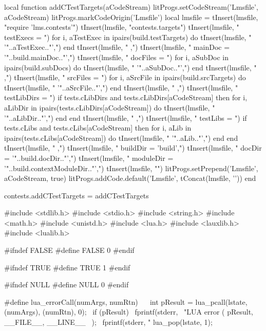 local function addCTestTargets(aCodeStream)
  litProgs.setCodeStream('Lmsfile', aCodeStream)
  litProgs.markCodeOrigin('Lmsfile')
  local lmsfile = {}
  tInsert(lmsfile, "require 'lms.contests'\n")
  tInsert(lmsfile, "contests.targets{")
  tInsert(lmsfile, "  testExecs = {")
  for i, aTestExec in ipairs(build.testTargets) do
    tInsert(lmsfile, "    '"..aTestExec.."',")
  end
  tInsert(lmsfile, "  },")
  tInsert(lmsfile, "  mainDoc = '"..build.mainDoc.."',")
  tInsert(lmsfile, "  docFiles = {")
  for i, aSubDoc in ipairs(build.subDocs) do
    tInsert(lmsfile, "    '"..aSubDoc.."',")
  end
  tInsert(lmsfile, "  },")
  tInsert(lmsfile, "  srcFiles = {")
  for i, aSrcFile in ipairs(build.srcTargets) do
    tInsert(lmsfile, "    '"..aSrcFile.."',")
  end
  tInsert(lmsfile, "  },")
  tInsert(lmsfile, "  testLibDirs = {")
  if tests.cLibDirs and tests.cLibDirs[aCodeStream] then
    for i, aLibDir in ipairs(tests.cLibDirs[aCodeStream]) do
      tInsert(lmsfile, "    '"..aLibDir.."',")
    end
  end
  tInsert(lmsfile, "  },")
  tInsert(lmsfile, "  testLibs = {")
  if tests.cLibs and tests.cLibs[aCodeStream] then
    for i, aLib in ipairs(tests.cLibs[aCodeStream]) do
      tInsert(lmsfile, "    '"..aLib.."',")
    end
  end
  tInsert(lmsfile, "  },")
  tInsert(lmsfile, "  buildDir  = 'build',")
  tInsert(lmsfile, "  docDir    = '"..build.docDir.."',")
  tInsert(lmsfile, "  moduleDir = '"..build.contextModuleDir.."',")
  tInsert(lmsfile, "}")
  litProgs.setPrepend('Lmsfile', aCodeStream, true)
  litProgs.addCode.default('Lmsfile', tConcat(lmsfile, '\n'))
end

contests.addCTestTargets = addCTestTargets
\stopLuaCode

\startCHeader
#include <stdlib.h>
#include <stdio.h>
#include <string.h>
#include <math.h>
#include <unistd.h>
#include <lua.h>
#include <lauxlib.h>
#include <lualib.h>

#ifndef FALSE
#define FALSE 0
#endif

#ifndef TRUE
#define TRUE 1
#endif

#ifndef NULL
#define NULL 0
#endif

#define lua_errorCall(numArgs, numRtn)                     \
{                                                          \
  int pResult = lua_pcall(lstate, (numArgs), (numRtn), 0); \
  if (pResult) {                                           \
    fprintf(stderr,                                        \
      "LUA error (%
      pResult, __FILE__, __LINE__                          \
    );                                                     \
    fprintf(stderr, "%
    lua_pop(lstate, 1);                                    \
  }                                                        \
}

